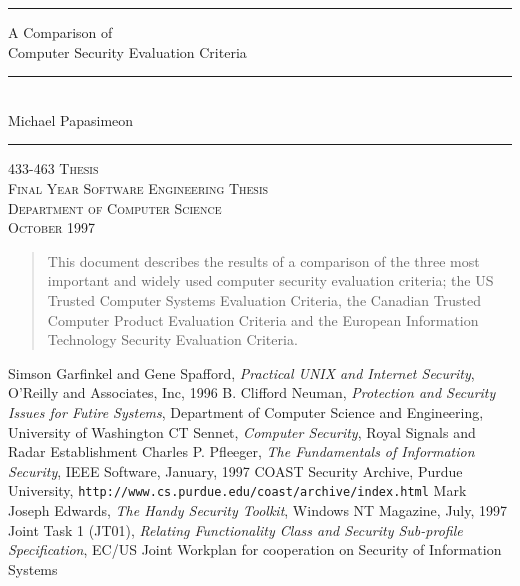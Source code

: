 \documentclass[a4paper,titlepage]{report}
\renewcommand{\bibname}{References}
\newcommand{\HRule}{\rule{\textwidth}{1mm}}
\newcommand{\Trule}{\rule{\textwidth}{0.1pt}}
\newcommand{\maketitlepage}[2]{
    \begin{titlepage}
    \vspace*{\stretch{1}}
    \HRule
    \begin{flushright}
        {\textsf{{ \Huge  #1} }}
        \\[5mm]
        \Trule
        \\[5mm]
        \Large \textsf{#2}
    \end{flushright}
    \HRule
    \vspace*{\stretch{2}}
    \begin{center}
        \Large\textsc{433-463 Thesis\\
                      Final Year Software Engineering Thesis\\
                      Department of Computer Science\\
                      October 1997}
    \end{center}
    \end{titlepage}
}
\begin{document}
    \maketitlepage{A Comparison of \\ 
    Computer Security Evaluation Criteria}{Michael Papasimeon} 
    \begin{abstract}
            This document describes the results of a comparison of
            the three most important and widely used computer security
            evaluation criteria; the US Trusted Computer Systems
            Evaluation Criteria, the Canadian Trusted Computer Product
            Evaluation Criteria and the European Information Technology
            Security Evaluation Criteria.
    \end{abstract}
    \tableofcontents
    \listoftables
    \newpage

    
    
    
    
    
    
    \appendix
    
    
    

    \renewcommand{\bibname}{References Used but not Cited}
    \begin{thebibliography}{it}
            Simson Garfinkel and Gene Spafford, 
            \emph{Practical UNIX and Internet Security},
            O'Reilly and Associates, Inc, 1996
            B. Clifford Neuman,
            \emph{Protection and Security Issues for Futire Systems},
            Department of Computer Science and Engineering,
            University of Washington
            CT Sennet,
            \emph{Computer Security},
            Royal Signals and Radar Establishment
            Charles P. Pfleeger,
            \emph{The Fundamentals of Information Security},
            IEEE Software, January, 1997
            COAST Security Archive,
            Purdue University, \newline
            \texttt{http://www.cs.purdue.edu/coast/archive/index.html}
            Mark Joseph Edwards,
            \emph{The Handy Security Toolkit}, 
            Windows NT Magazine, July, 1997
            Joint Task 1 (JT01),
            \emph{Relating Functionality Class and Security Sub-profile Specification},
            EC/US Joint Workplan for cooperation on Security of Information Systems
    \end{thebibliography}
\end{document}
